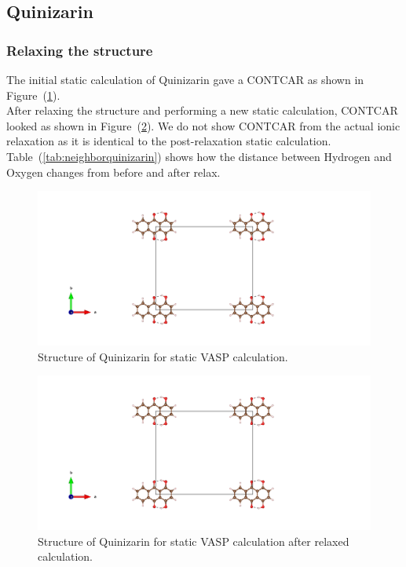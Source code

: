 \documentclass{article}
\begin{document}
    \vspace{1cm}

  \subsection{Quinizarin}

    \subsubsection{Relaxing the structure}

      The initial static calculation of Quinizarin gave a CONTCAR as shown in Figure~(\ref{fig:basic_staticbefore_CONTCAR}). \\

      After relaxing the structure and performing a new static calculation, CONTCAR looked as shown in Figure~(\ref{fig:basic_staticafter_CONTCAR}). We do not show CONTCAR from the actual ionic relaxation as it is identical to the post-relaxation static calculation. \\

      Table~(\ref{tab:neighborquinizarin}) shows how the distance between Hydrogen and Oxygen changes from before and after relax. \\

      \begin{figure}[H]
        \centering
        \includegraphics[width = \textwidth]{../fig/basic_staticbefore_CONTCAR.png}
        \caption{Structure of Quinizarin for static VASP calculation. }
        \label{fig:basic_staticbefore_CONTCAR}
      \end{figure}

      \begin{figure}[H]
        \centering
        \includegraphics[width = \textwidth]{../fig/basic_staticafter_CONTCAR.png}
        \caption{Structure of Quinizarin for static VASP calculation after relaxed calculation. }
        \label{fig:basic_staticafter_CONTCAR}
      \end{figure}
\end{document}
